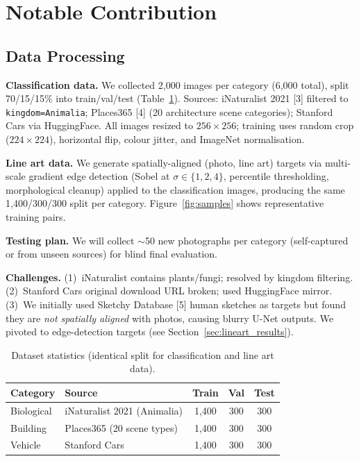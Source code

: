 \documentclass{article}
\begin{document}
\section{Notable Contribution}

\subsection{Data Processing}

\textbf{Classification data.}
We collected 2{,}000 images per category (6{,}000 total), split 70/15/15\% into train/val/test (Table~\ref{tab:data}).
Sources: iNaturalist 2021 [3] filtered to \texttt{kingdom=Animalia}; Places365 [4] (20 architecture scene categories); Stanford Cars via HuggingFace.
All images resized to $256{\times}256$; training uses random crop ($224{\times}224$), horizontal flip, colour jitter, and ImageNet normalisation.

\textbf{Line art data.}
We generate spatially-aligned (photo, line art) targets via multi-scale gradient edge detection (Sobel at $\sigma\in\{1,2,4\}$, percentile thresholding, morphological cleanup) applied to the classification images, producing the same 1{,}400/300/300 split per category.
Figure~\ref{fig:samples} shows representative training pairs.

\textbf{Testing plan.} We will collect $\sim$50 new photographs per category (self-captured or from unseen sources) for blind final evaluation.

\textbf{Challenges.}
(1)~iNaturalist contains plants/fungi; resolved by kingdom filtering.
(2)~Stanford Cars original download URL broken; used HuggingFace mirror.
(3)~We initially used Sketchy Database [5] human sketches as targets but found they are \emph{not spatially aligned} with photos, causing blurry U-Net outputs. We pivoted to edge-detection targets (see Section~\ref{sec:lineart_results}).

\begin{table}[h]
\centering
\vspace{-2mm}
\caption{Dataset statistics (identical split for classification and line art data).}
\label{tab:data}
\vspace{1mm}
\small
\begin{tabular}{llccc}
\toprule
\textbf{Category} & \textbf{Source} & \textbf{Train} & \textbf{Val} & \textbf{Test} \\
\midrule
Biological & iNaturalist 2021 (Animalia) & 1{,}400 & 300 & 300 \\
Building   & Places365 (20 scene types) & 1{,}400 & 300 & 300 \\
Vehicle    & Stanford Cars & 1{,}400 & 300 & 300 \\
\bottomrule
\end{tabular}
\vspace{-4mm}
\end{table}
\end{document}
